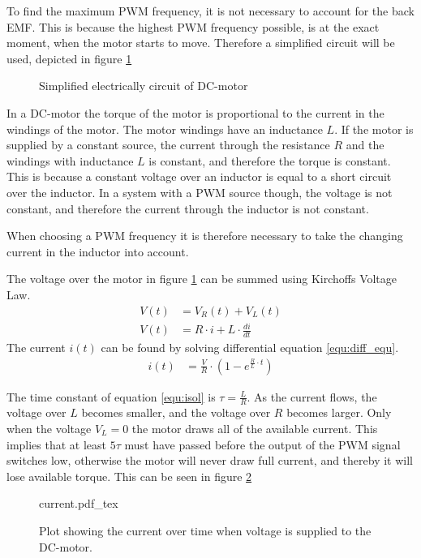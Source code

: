 \documentclass[../../../Main]{subfiles}
\begin{document}
To find the maximum PWM frequency, it is not necessary to account for the back EMF. This is because the highest PWM frequency possible, is at the exact moment, when the motor starts to move. Therefore a simplified circuit will be used, depicted in figure \ref{fig:electrical}

\begin{figure}[H]
	\center
    \def\svgwidth{0.4\textwidth}
	
	\caption{Simplified electrically circuit of DC-motor}
  \label{fig:electrical}
\end{figure}


In a DC-motor the torque of the motor is proportional to the current in the windings of the motor. The motor windings have an inductance $L$.
If the motor is supplied by a constant source, the current through the resistance $R$ and the windings with inductance $L$ is constant, and therefore the torque is constant. This is because a constant voltage over an inductor is equal to a short circuit over the inductor.
In a system with a PWM source though, the voltage is not constant, and therefore the current through the inductor is not constant.

When choosing a PWM frequency it is therefore necessary to take the changing current in the inductor into account.

The voltage over the motor in figure \ref{fig:electrical} can be summed using Kirchoffs Voltage Law.
\begin{align}
	V(t) &= V_R(t) + V_L(t)\\
	V(t) &= R \cdot i + L \cdot \frac{di}{dt}
	\label{equ:diff_equ}
\end{align}
The current $i(t)$ can be found by solving differential equation \eqref{equ:diff_equ}.
\begin{align}
	i(t) &=\frac{V}{R} \cdot (1-e^{\frac{R}{L} \cdot t})
	\label{equ:isol}
\end{align}

The time constant of equation \eqref{equ:isol} is $\tau = \frac{L}{R}$.
As the current flows, the voltage over $L$ becomes smaller, and the voltage over $R$ becomes larger. Only when the voltage $V_L = 0$ the motor draws all of the available current.
This implies that at least $5\tau$ must have passed before the output of the PWM signal switches low, otherwise the motor will never draw full current, and thereby it will lose available torque. This can be seen in figure \ref{fig:currentplot}

\begin{figure}[H]
\centering
\def\svgwidth{\textwidth}
{current.pdf_tex}
\caption{Plot showing the current over time when voltage is supplied to the DC-motor.}
\label{fig:currentplot}
\end{figure}
\end{document}
